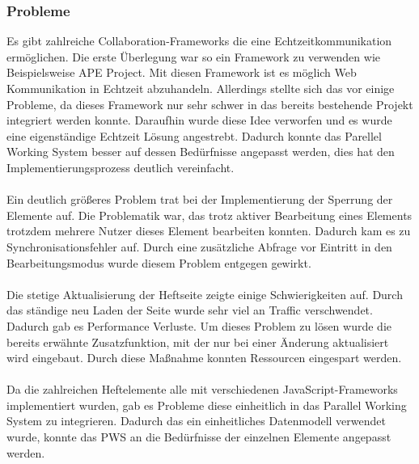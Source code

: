 \subsubsection{Probleme}
Es gibt zahlreiche Collaboration-Frameworks die eine Echtzeitkommunikation ermöglichen. Die erste Überlegung war so ein Framework zu verwenden wie Beispielsweise APE Project\cite{APE}. Mit diesen Framework ist es möglich Web Kommunikation in Echtzeit abzuhandeln. Allerdings stellte sich das vor einige Probleme, da dieses Framework nur sehr schwer in das bereits bestehende Projekt integriert werden konnte. Daraufhin wurde diese Idee verworfen und es wurde eine eigenständige Echtzeit Lösung angestrebt. Dadurch konnte das Parellel Working System besser auf dessen Bedürfnisse angepasst werden, dies hat den Implementierungsprozess deutlich vereinfacht. \\
\\
Ein deutlich größeres Problem trat bei der Implementierung der Sperrung der Elemente auf. Die Problematik war, das trotz aktiver Bearbeitung eines Elements trotzdem mehrere Nutzer dieses Element bearbeiten konnten. Dadurch kam es zu Synchronisationsfehler auf. Durch eine zusätzliche Abfrage vor Eintritt in den Bearbeitungsmodus wurde diesem Problem entgegen gewirkt. \\
\\
Die stetige Aktualisierung der Heftseite zeigte einige Schwierigkeiten auf. Durch das ständige neu Laden der Seite wurde sehr viel an Traffic verschwendet. Dadurch gab es Performance Verluste. Um dieses Problem zu lösen wurde die bereits erwähnte Zusatzfunktion, mit der nur bei einer Änderung aktualisiert wird eingebaut. Durch diese Maßnahme konnten Ressourcen eingespart werden.\\
\\
Da die zahlreichen Heftelemente alle mit verschiedenen JavaScript-Frameworks implementiert wurden, gab es Probleme diese einheitlich in das Parallel Working System zu integrieren. Dadurch das ein einheitliches Datenmodell verwendet wurde, konnte das PWS an die Bedürfnisse der einzelnen Elemente angepasst werden. 
